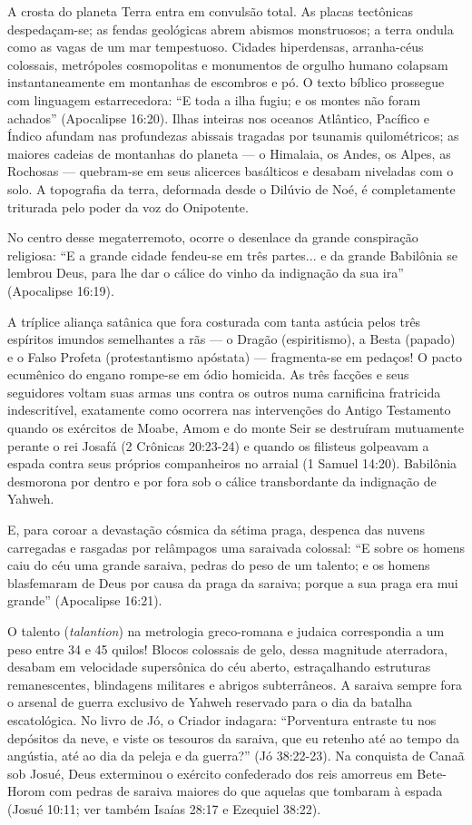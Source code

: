 \documentclass[11pt,a4paper,openany]{book}
\begin{document}
A crosta do planeta Terra entra em convulsão total. As placas tectônicas despedaçam-se; as fendas geológicas abrem abismos monstruosos; a terra ondula como as vagas de um mar tempestuoso. Cidades hiperdensas, arranha-céus colossais, metrópoles cosmopolitas e monumentos de orgulho humano colapsam instantaneamente em montanhas de escombros e pó.
O texto bíblico prossegue com linguagem estarrecedora: ``E toda a ilha fugiu; e os montes não foram achados'' (Apocalipse 16:20).
Ilhas inteiras nos oceanos Atlântico, Pacífico e Índico afundam nas profundezas abissais tragadas por tsunamis quilométricos; as maiores cadeias de montanhas do planeta — o Himalaia, os Andes, os Alpes, as Rochosas — quebram-se em seus alicerces basálticos e desabam niveladas com o solo. A topografia da terra, deformada desde o Dilúvio de Noé, é completamente triturada pelo poder da voz do Onipotente.

No centro desse megaterremoto, ocorre o desenlace da grande conspiração religiosa:
``E a grande cidade fendeu-se em três partes... e da grande Babilônia se lembrou Deus, para lhe dar o cálice do vinho da indignação da sua ira'' (Apocalipse 16:19).

A tríplice aliança satânica que fora costurada com tanta astúcia pelos três espíritos imundos semelhantes a rãs — o Dragão (espiritismo), a Besta (papado) e o Falso Profeta (protestantismo apóstata) — fragmenta-se em pedaços! O pacto ecumênico do engano rompe-se em ódio homicida. As três facções e seus seguidores voltam suas armas uns contra os outros numa carnificina fratricida indescritível, exatamente como ocorrera nas intervenções do Antigo Testamento quando os exércitos de Moabe, Amom e do monte Seir se destruíram mutuamente perante o rei Josafá (2 Crônicas 20:23-24) e quando os filisteus golpeavam a espada contra seus próprios companheiros no arraial (1 Samuel 14:20). Babilônia desmorona por dentro e por fora sob o cálice transbordante da indignação de Yahweh.

E, para coroar a devastação cósmica da sétima praga, despenca das nuvens carregadas e rasgadas por relâmpagos uma saraivada colossal:
``E sobre os homens caiu do céu uma grande saraiva, pedras do peso de um talento; e os homens blasfemaram de Deus por causa da praga da saraiva; porque a sua praga era mui grande'' (Apocalipse 16:21).

O talento (\textit{talantion}) na metrologia greco-romana e judaica correspondia a um peso entre 34 e 45 quilos! Blocos colossais de gelo, dessa magnitude aterradora, desabam em velocidade supersônica do céu aberto, estraçalhando estruturas remanescentes, blindagens militares e abrigos subterrâneos.
A saraiva sempre fora o arsenal de guerra exclusivo de Yahweh reservado para o dia da batalha escatológica. No livro de Jó, o Criador indagara: ``Porventura entraste tu nos depósitos da neve, e viste os tesouros da saraiva, que eu retenho até ao tempo da angústia, até ao dia da peleja e da guerra?'' (Jó 38:22-23). Na conquista de Canaã sob Josué, Deus exterminou o exército confederado dos reis amorreus em Bete-Horom com pedras de saraiva maiores do que aquelas que tombaram à espada (Josué 10:11; ver também Isaías 28:17 e Ezequiel 38:22).
\end{document}
